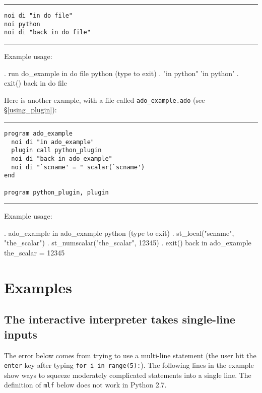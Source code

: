 \documentclass{article}
\begin{document}
\hrule
\begin{lstlisting}
noi di "in do file"
noi python
noi di "back in do file"
\end{lstlisting}
\hrule

\vspace{5mm}
\noindent Example usage:
\begin{stlog}
{\smallskip}
. run do_example
in do file
 python (type {} to exit) 
. "in python"
'in python'
{\smallskip}
. exit()
back in do file
\end{stlog}

\vspace{5mm}
\noindent Here is another example, with a file called \lstinline{ado_example.ado} (see \S\ref{using_plugin}): \newline

\hrule
\begin{lstlisting}
program ado_example
  noi di "in ado_example"
  plugin call python_plugin
  noi di "back in ado_example"
  noi di "`scname' = " scalar(`scname')
end

program python_plugin, plugin
\end{lstlisting}
\hrule

\medskip

\noindent Example usage:

\medskip

\begin{stlog}
. ado_example
in ado_example
 python (type {} to exit) 
. st_local("scname", "the_scalar")
{\smallskip}
. st_numscalar("the_scalar", 12345)
{\smallskip}
. exit()
back in ado_example
the_scalar = 12345
\end{stlog}

	
	
\section{Examples} \label{examples}
	
\subsection{The interactive interpreter takes single-line inputs} \label{single_line_example}

The error below comes from trying to use a multi-line statement (the user hit the \lstinline$enter$ key after typing \lstinline$for i in range(5):$). The following lines in the example show ways to squeeze moderately complicated statements into a single line. The definition of \lstinline$mlf$ below does not work in Python 2.7.
\end{document}
